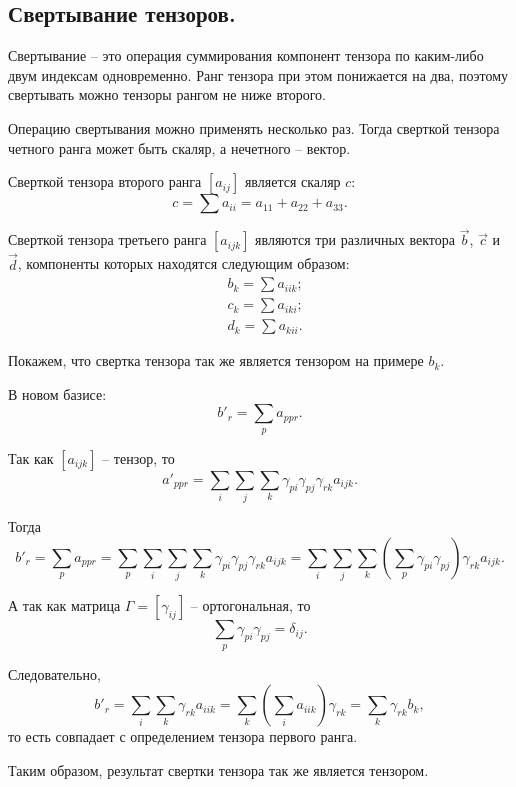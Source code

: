 \subsection{Свертывание тензоров.}

	Свертывание -- это операция суммирования компонент тензора по каким-либо двум индексам одновременно. Ранг тензора при этом понижается на два, поэтому свертывать можно тензоры рангом не ниже второго.
	
	Операцию свертывания можно применять несколько раз. Тогда сверткой тензора четного ранга может быть скаляр, а нечетного -- вектор.
	
	\begin{example}
	
	Сверткой тензора второго ранга \( [a_{ij}] \) является скаляр \( c \):
	\[ c = \sum a_{ii} = a_{11} + a_{22} + a_{33}. \]
	\end{example}
	
	\begin{example}
	
	Сверткой тензора третьего ранга \( [a_{ijk}] \) являются три различных вектора \( \vec{b} \), \( \vec{c} \) и \( \vec{d} \), компоненты которых находятся следующим образом:
	\begin{align}
	& b_k = \sum a_{iik}; \nonumber \\
	& c_k = \sum a_{iki}; \nonumber \\
	& d_k = \sum a_{kii}. \nonumber 
	\end{align}
	
	Покажем, что свертка тензора так же является тензором на примере \( b_k \).
	
	В новом базисе:
	\[ b{'}_r = \sum\limits_p a_{ppr}. \]
	
	Так как \( [a_{ijk}] \) -- тензор, то
	\[ a{'}_{ppr} = \sum\limits_i \sum\limits_j \sum\limits_k \gamma_{pi}\gamma_{pj}\gamma_{rk} a_{ijk}. \]
	
	Тогда
	\[ b{'}_r = \sum\limits_p a_{ppr} = \sum\limits_p \sum\limits_i \sum\limits_j \sum\limits_k \gamma_{pi}\gamma_{pj}\gamma_{rk} a_{ijk} = \sum\limits_i \sum\limits_j \sum\limits_k \left( \sum\limits_p \gamma_{pi}\gamma_{pj} \right) \gamma_{rk} a_{ijk}. \]
	
	А так как матрица \( \Gamma = [\gamma_{ij}] \) -- ортогональная, то
	\[ \sum\limits_p \gamma_{pi}\gamma_{pj} = \delta_{ij}. \]
	
	Следовательно,
	\[ b{'}_r = \sum_i\sum_k \gamma_{rk} a_{iik} = \sum\limits_k \left( \sum\limits_i a_{iik} \right) \gamma_{rk} = \sum\limits_k \gamma_{rk} b_k, \]
	то есть совпадает с определением тензора первого ранга.
	
	Таким образом, результат свертки тензора так же является тензором.
	\end{example}

